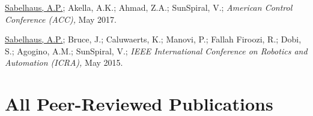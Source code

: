 \documentclass[letterpaper]{deedy-resume} %
\begin{document}
\begin{etaremune}

\item {} \underline{Sabelhaus, A.P.}; Akella, A.K.; Ahmad, Z.A.; SunSpiral, V.; {\it American Control Conference (ACC),} May 2017.

\item {} \underline{Sabelhaus, A.P.}; Bruce, J.; Caluwaerts, K.; Manovi, P.; Fallah Firoozi, R.; Dobi, S.; Agogino, A.M.; SunSpiral, V.; {\it IEEE International Conference on Robotics and Automation (ICRA),} May 2015.

\end{etaremune}


\vspace{0.2cm}
\section{All Peer-Reviewed Publications}
\vspace{0.2cm}

\end{document}
